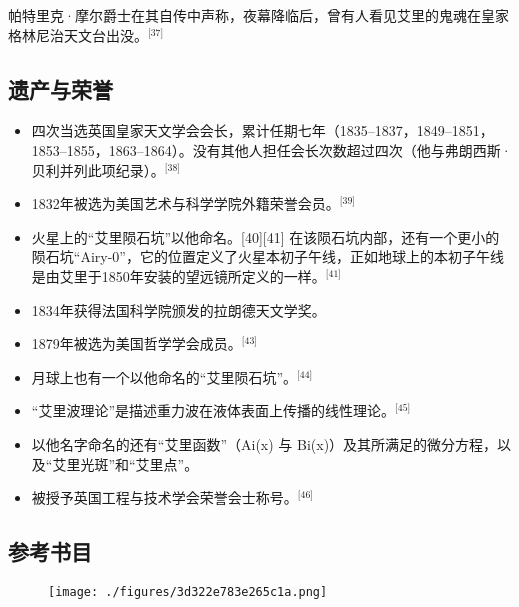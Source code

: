 帕特里克·摩尔爵士在其自传中声称，夜幕降临后，曾有人看见艾里的鬼魂在皇家格林尼治天文台出没。\(^\text{[37]}\)
\subsection{遗产与荣誉}
\begin{itemize}
\item 四次当选英国皇家天文学会会长，累计任期七年（1835–1837，1849–1851，1853–1855，1863–1864）。没有其他人担任会长次数超过四次（他与弗朗西斯·贝利并列此项纪录）。\(^\text{[38]}\)
\item 1832年被选为美国艺术与科学学院外籍荣誉会员。\(^\text{[39]}\)
\item 火星上的“艾里陨石坑”以他命名。[40][41] 在该陨石坑内部，还有一个更小的陨石坑“Airy-0”，它的位置定义了火星本初子午线，正如地球上的本初子午线是由艾里于1850年安装的望远镜所定义的一样。\(^\text{[41]}\)
\item 1834年获得法国科学院颁发的拉朗德天文学奖。
\item 1879年被选为美国哲学学会成员。\(^\text{[43]}\)
\item 月球上也有一个以他命名的“艾里陨石坑”。\(^\text{[44]}\)
\item “艾里波理论”是描述重力波在液体表面上传播的线性理论。\(^\text{[45]}\)
\item 以他名字命名的还有“艾里函数”（Ai(x) 与 Bi(x)）及其所满足的微分方程，以及“艾里光斑”和“艾里点”。
\item 被授予英国工程与技术学会荣誉会士称号。\(^\text{[46]}\)
\end{itemize}
\subsection{参考书目}
\begin{figure}[ht]
\centering
\texttt{[image: ./figures/3d322e783e265c1a.png]}
\caption{} \label{fig_AL_10}
\end{figure}

